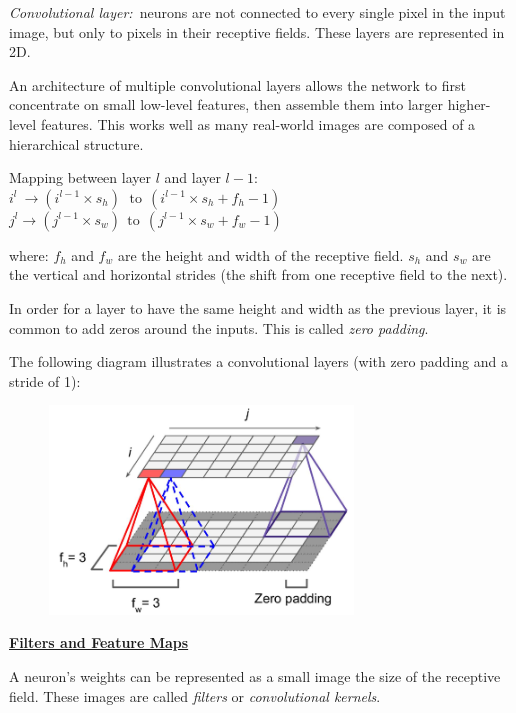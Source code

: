 \textit{Convolutional layer:}~neurons are not connected to every single pixel in the input image,
but only to pixels in their receptive fields. These layers are represented in 2D.

An architecture of multiple convolutional layers allows the network to first concentrate on small low-level features,
then assemble them into larger higher-level features.
This works well as many real-world images are composed of a hierarchical structure.

Mapping between layer $l$ and layer $l-1$:\newline
$i^{l} ~\rightarrow (i^{l-1} \times s_h)~~\,\textrm{to}~~(i^{l-1} \times s_h + f_h -1)$\newline
$j^{l} \rightarrow (j^{l-1} \times s_w)~~\textrm{to}~~(j^{l-1} \times s_w + f_w -1)$

where:\newline
$f_h$ and $f_w$ are the height and width of the receptive field.\newline
$s_h$ and $s_w$ are the vertical and horizontal strides (the shift from one receptive field to the next).

In order for a layer to have the same height and width as the previous layer,
it is common to add zeros around the inputs. This is called \textit{zero padding}.

The following diagram illustrates a convolutional layers (with zero padding and a stride of 1):

\begin{figure}[ht]
\centering
\includegraphics[width=0.72\textwidth]{./images/conv_layer.png}
\end{figure}

\newpage

\textbf{\underline{Filters and Feature Maps}}

A neuron's weights can be represented as a small image the size of the receptive field.\newline
These images are called \textit{filters} or \textit{convolutional kernels}.

